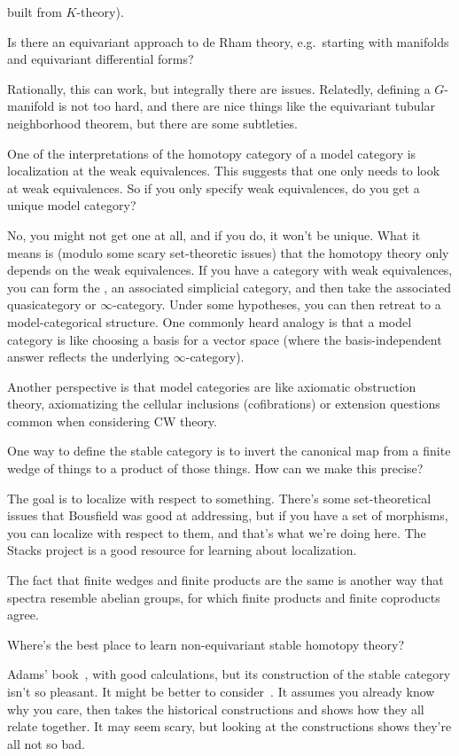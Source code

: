 built from $K$-theory).
\begin{ques}
Is there an equivariant approach to de Rham theory, e.g.\ starting with manifolds and equivariant differential
forms?
\end{ques}
Rationally, this can work, but integrally there are issues. Relatedly, defining a $G$-manifold is not too hard, and
there are nice things like the equivariant tubular neighborhood theorem, but there are some subtleties.
\begin{ques}
One of the interpretations of the homotopy category of a model category is localization at the weak equivalences.
This suggests that one only needs to look at weak equivalences. So if you only specify weak equivalences, do you
get a unique model category?
\end{ques}
No, you might not get one at all, and if you do, it won't be unique. What it means is (modulo some scary
set-theoretic issues) that the homotopy theory only depends on the weak equivalences. If you have a category with
weak equivalences, you can form the , an associated simplicial category, and then take
the associated quasicategory or $\infty$-category. Under some hypotheses, you can then retreat to a
model-categorical structure. One commonly heard analogy is that a model category is like choosing a basis for a
vector space (where the basis-independent answer reflects the underlying $\infty$-category).

Another perspective is that model categories are like axiomatic obstruction theory, axiomatizing the cellular
inclusions (cofibrations) or extension questions common when considering CW theory.
\begin{ques}
One way to define the stable category is to invert the canonical map from a finite wedge of things to a product of
those things. How can we make this precise?
\end{ques}
The goal is to localize with respect to something. There's some set-theoretical issues that Bousfield was good at
addressing, but if you have a set of morphisms, you can localize with respect to them, and that's what we're doing
here. The Stacks project is a good resource for learning about localization.

The fact that finite wedges and finite products are the same is another way that spectra resemble abelian groups,
for which finite products and finite coproducts agree.
\begin{ques}
Where's the best place to learn non-equivariant stable homotopy theory?
\end{ques}
Adams' book~\cite{AdamsStableHomotopy}, with good calculations, but its construction of the stable category isn't
so pleasant. It might be better to consider~\cite{MMSS}. It assumes you already know why you care, then takes the
historical constructions and shows how they all relate together. It may seem scary, but looking at the
constructions shows they're all not so bad.

